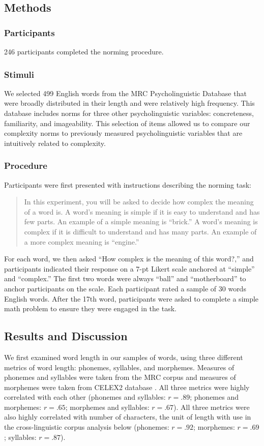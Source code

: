 \documentclass[man]{apa2}
\begin{document}
\subsection{Methods}
\subsubsection{Participants} 246 participants completed the norming procedure.
\subsubsection{Stimuli}
We selected 499 English words from the MRC Psycholinguistic Database \cite{wilson1988mrc} that were broadly distributed in their length and were relatively high frequency. This database includes norms for three other psycholinguistic variables: concreteness, familiarity, and imageability. This selection of items allowed us to compare our complexity norms to previously measured psycholinguistic variables that are intuitively related to complexity.

\subsubsection{Procedure}
Participants were first presented with instructions describing the norming task:
\begin{quote}
In this experiment, you will be asked to decide how complex the meaning of a word is. A word's meaning is simple if it is easy to understand and has few parts. An example of a simple meaning is ``brick.'' A word's meaning is complex if it is difficult to understand and has many parts. An example of a more complex meaning is ``engine.''
\end{quote}
For each word, we then asked ``How complex is the meaning of this word?,'' and participants indicated their response on a 7-pt Likert scale anchored at ``simple'' and ``complex.'' The first two words were always ``ball'' and ``motherboard'' to anchor participants on the scale. Each participant rated a sample of 30 words English words. After the 17th word, participants were asked to complete a simple math problem to ensure they were engaged in the task.

\subsection{Results and Discussion}

We first examined word length in our samples of words, using three different metrics of word length: phonemes, syllables, and morphemes. Measures of phonemes and syllables were taken from the MRC corpus \cite{wilson1988mrc} and measures of morphemes were taken from CELEX2 database \cite{baayen1995celex2}. All three metrics were highly correlated with each other (phonemes and syllables: $r = .89$; phonemes and morphemes: $r = .65$; morphemes and syllables: $r = .67$). All three metrics were also highly correlated with number of characters, the unit of length with use in the cross-linguistic corpus analysis below (phonemes: $r = .92$; morphemes: $r = .69$; syllables: $r = .87$).
\end{document}
